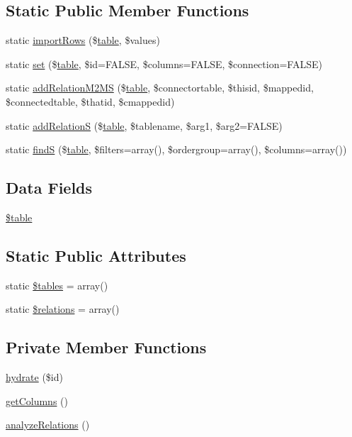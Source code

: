 \subsection*{Static Public Member Functions}
\begin{DoxyCompactItemize}
\item 
static \hyperlink{classtable_a0b7ba4f111f6cd48fadd4c61966cc308}{importRows} (\$\hyperlink{classtable}{table}, \$values)
\item 
static \hyperlink{classtable_a6c52ede0b29dff2c2aaf5a9f7c220de0}{set} (\$\hyperlink{classtable}{table}, \$id=FALSE, \$columns=FALSE, \$connection=FALSE)
\item 
static \hyperlink{classtable_a9b398e8dfd316739e74a7d19f2d988f0}{addRelationM2MS} (\$\hyperlink{classtable}{table}, \$connectortable, \$thisid, \$mappedid, \$connectedtable, \$thatid, \$cmappedid)
\item 
static \hyperlink{classtable_aa3af4eeabe0a499ae25ef80fc93abbbd}{addRelationS} (\$\hyperlink{classtable}{table}, \$tablename, \$arg1, \$arg2=FALSE)
\item 
static \hyperlink{classtable_ae5daa73e570561db01a6198d85c50a1d}{findS} (\$\hyperlink{classtable}{table}, \$filters=array(), \$ordergroup=array(), \$columns=array())
\end{DoxyCompactItemize}
\subsection*{Data Fields}
\begin{DoxyCompactItemize}
\item 
\hyperlink{classtable_ae8876a14058f368335baccf35af4a22b}{\$table}
\end{DoxyCompactItemize}
\subsection*{Static Public Attributes}
\begin{DoxyCompactItemize}
\item 
static \hyperlink{classtable_a3d332a3c374a53802495dcb045f6133f}{\$tables} = array()
\item 
static \hyperlink{classtable_a5787b67dccb801e89f4ff779d42edece}{\$relations} = array()
\end{DoxyCompactItemize}
\subsection*{Private Member Functions}
\begin{DoxyCompactItemize}
\item 
\hyperlink{classtable_acd2fc9d3975a06de8837cbb9086eebd3}{hydrate} (\$id)
\item 
\hyperlink{classtable_a6287262cb9628d7a89d8fc16dcb51177}{getColumns} ()
\item 
\hyperlink{classtable_a143749a0fde8ad809f2be26ff1f9fcbd}{analyzeRelations} ()
\end{DoxyCompactItemize}
